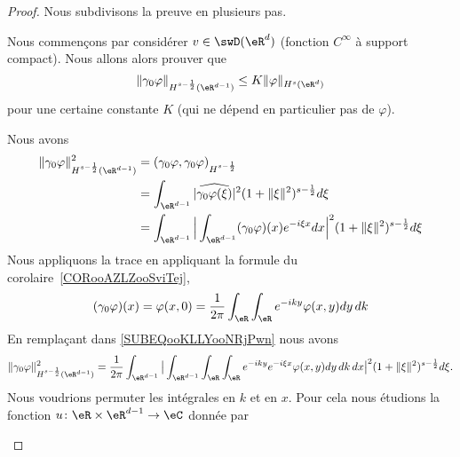 \begin{proof}
	Nous subdivisons la preuve en plusieurs pas.
	\begin{subproof}
		Nous commençons par considérer \( v\in \swD(\eR^d)\) (fonction \(  C^{\infty}\) à support compact). Nous allons alors prouver que
		\begin{equation}
			\| \gamma_0\varphi \|_{H^{s-\frac{ 1 }{2}}(\eR^{d-1})}\leq K\| \varphi \|_{H^s(\eR^d)}
		\end{equation}
		pour une certaine constante \( K\) (qui ne dépend en particulier pas de \( \varphi\)).

		Nous avons
		\begin{subequations}
			\begin{align}
				\| \gamma_0\varphi \|^2_{H^{s-\frac{ 1 }{2}}(\eR^{d-1})} & =(  \gamma_0\varphi,\gamma_0\varphi  )_{H^{s-\frac{ 1 }{2}}}                                                                                       \\
				                                                         & =\int_{\eR^{d-1}}| \widehat{\gamma_0\varphi(\xi)} |^2(1+\| \xi \|^2)^{s-\frac{ 1 }{2}}d\xi                                                         \\
				                                                         & =\int_{\eR^{d-1}}\Big| \int_{\eR^{d-1}}(\gamma_0\varphi)(x) e^{-i\xi x}dx \Big|^2(1+\| \xi \|^2)^{s-\frac{ 1 }{2}}d\xi \label{SUBEQooKLLYooNRjPwn} \\
			\end{align}
		\end{subequations}
		Nous appliquons la trace en appliquant la formule du corolaire~\ref{CORooAZLZooSviTej},
		\begin{equation}
			(\gamma_0\varphi)(x)= \varphi(x,0) =\frac{1}{ 2\pi }\int_{\eR}\int_{\eR} e^{-iky}\varphi(x,y)dy\,dk
		\end{equation}
		En remplaçant dans \eqref{SUBEQooKLLYooNRjPwn} nous avons
		\begin{equation}
			\| \gamma_0\varphi \|^2_{H^{s-\frac{ 1 }{2}}(\eR^{d-1})}=\frac{1}{ 2\pi }\int_{\eR^{d-1}}\big| \int_{\eR^{d-1}}\int_{\eR}\int_{\eR} e^{-iky} e^{-i\xi x}\varphi(x,y)dy\,dk\,dx \big|^2(1+\| \xi \|^2)^{s-\frac{ 1 }{2}}d\xi.
		\end{equation}
		Nous voudrions permuter les intégrales en \( k\) et en \( x\). Pour cela nous étudions la fonction \( u\colon \eR\times \eR^{d-1}\to \eC\) donnée par
		\begin{equation}

\end{equation}
\end{subproof}
\end{proof}
